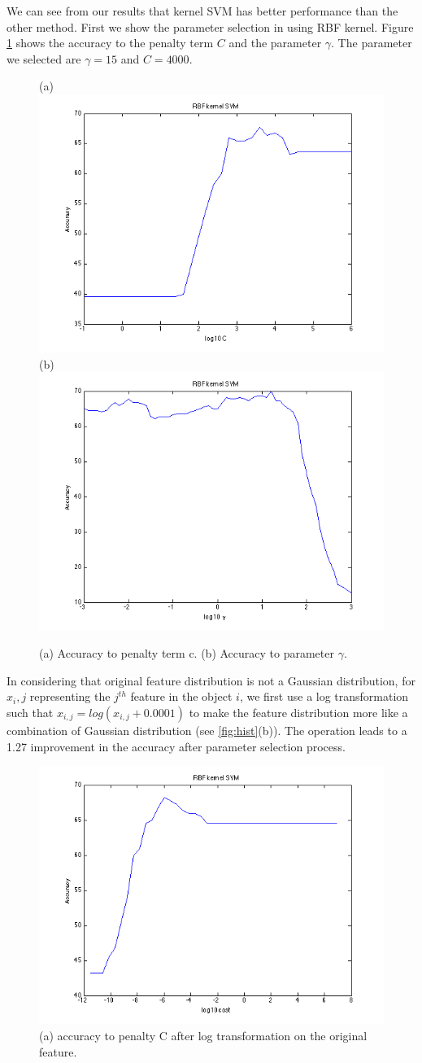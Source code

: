 \documentclass{article} %
\begin{document}
We can see from our results that kernel SVM has better performance than the other method. First we show the parameter selection in using RBF kernel. Figure \ref{fig:RBF} shows the accuracy to the penalty term $C$ and the parameter $\gamma$. The parameter we selected are $\gamma = 15$ and $C = 4000$.

\begin{figure}[ht!]
    \centering
    {(a)\includegraphics[width=0.45\linewidth]{./Figure/RBF_cost_accuracy.png}
    (b)\includegraphics[width=0.45\linewidth]{./Figure/RBF_gamma_accuracy.png}}
    \caption{(a) Accuracy to penalty term c. (b) Accuracy to parameter $\gamma$. }
    \label{fig:RBF}
\end{figure}

In considering that original feature distribution is not a Gaussian distribution, for $x_i,j$ representing the $j^{th}$ feature in the object $i$, we first use a log transformation such that $x_{i,j} = log(x_{i,j} + 0.0001)$ to make the feature distribution more like a combination of Gaussian distribution (see \ref{fig:hist}(b)). The operation leads to a 1.27 improvement in the accuracy after parameter selection process.


\begin{figure}[ht!]
    \centering
    \includegraphics[width=0.45\linewidth]{./Figure/RBF_cost_accuracy_log.png}
     \centering
    \caption{(a) accuracy to penalty C after log transformation on the original feature.}
\end{figure}
\end{document}
